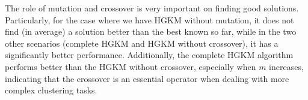 The role of mutation and crossover is very important on finding good solutions. Particularly, for the case where we have HGKM without mutation, it does not find (in average) a solution better than the best known so far, while in the two other scenarios (complete HGKM and HGKM without crossover), it has a significantly better performance. Additionally, the complete HGKM algorithm performs better than the HGKM without crossover, especially when $m$ increases, indicating that the crossover is an essential operator when dealing with more complex clustering tasks.

